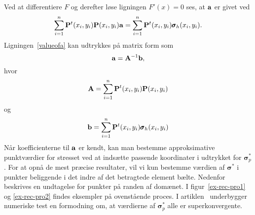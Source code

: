 Ved at differentiere $F$ og derefter løse ligningen $F'(x)=0$ ses, at
${\bf a}$ er givet ved
\begin{equation} \label{valueofa}
  \sum_{i=1}^n {\bf P}^t(x_i,y_i){\bf P}(x_i,y_i){\bf a} =
  \sum_{i=1}^n {\bf P}^t(x_i,y_i)\pmb{\sigma}_h (x_i,y_i).
\end{equation}
Ligningen~\eqref{valueofa} kan udtrykkes på matrix form som
\begin{equation}
  {\bf a} = {\bf A}^{-1}{\bf b},
\end{equation}
hvor
\begin{equation}
  {\bf A} = \sum_{i=1}^n {\bf P}^t(x_i,y_i){\bf P}(x_i,y_i)
\end{equation}
og
\begin{equation}
  {\bf b} = \sum_{i=1}^n {\bf P}^t(x_i,y_i)\pmb{\sigma}_h (x_i,y_i)
\end{equation}
Når koefficienterne til ${\bf a}$ er kendt, kan man bestemme
approksimative punktværdier for stresset ved at indsætte passende
koordinater i udtrykket for $\pmb{\sigma}^{\ast}_p$. For at opnå
de mest præcise resultater, vil vi kun bestemme værdien af $\pmb{\sigma}^{\ast}$ i
punkter beliggende i det indre af det betragtede element bælte.
Nedenfor beskrives en undtagelse for punkter på randen af domænet. I
figur~\ref{ex-rec-pro1} og \ref{ex-rec-pro2} findes eksempler på
ovenstående proces. I artiklen~\cite{zz3} underbygger numeriske test
en formodning om, at værdierne af $\pmb{\sigma}^{\ast}_p$ alle er
superkonvergente.

